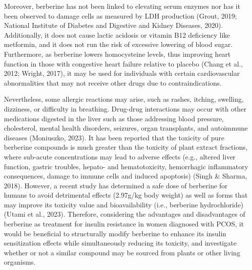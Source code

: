 Moreover, berberine has not been linked to elevating serum enzymes nor has it been observed to damage cells as measured by LDH production (Grout, 2019; National Institute of Diabetes and Digestive and Kidney Diseases, 2020). Additionally, it does not cause lactic acidosis or vitamin B12 deficiency like metformin, and it does not run the risk of excessive lowering of blood sugar. Furthermore, as berberine lowers homocysteine levels, thus improving heart function in those with congestive heart failure relative to placebo (Chang et al., 2012; Wright, 2017), it may be used for individuals with certain cardiovascular abnormalities that may not receive other drugs due to contraindications.  

Nevertheless, some allergic reactions may arise, such as rashes, itching, swelling, dizziness, or difficulty in breathing. Drug-drug interactions may occur with other medications digested in the liver such as those addressing blood pressure, cholesterol, mental health disorders, seizures, organ transplants, and autoimmune diseases (Moniuszko, 2023). It has been reported that the toxicity of pure berberine compounds is much greater than the toxicity of plant extract fractions, where sub-acute concentrations may lead to adverse effects (e.g.,  altered liver function, gastric troubles, hepato- and hematotoxicity, hemorrhagic inflammatory consequences, damage to immune cells and induced apoptosis) (Singh \& Sharma, 2018). However, a recent study has determined a safe dose of berberine for humans to avoid detrimental effects (2.97g/kg body weight) as well as forms that may improve its toxicity value and bioavailability (i.e., berberine hydrochloride) (Utami et al., 2023). Therefore, considering the advantages and disadvantages of berberine as treatment for insulin resistance in women diagnosed with PCOS, it would be beneficial to structurally modify berberine to enhance its insulin sensitization effects while simultaneously reducing its toxicity, and investigate whether or not a similar compound may be sourced from plants or other living organisms. 
